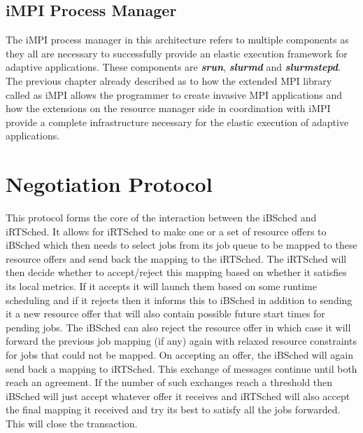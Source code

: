 \subsection{iMPI Process Manager}
The iMPI process manager in this architecture refers to multiple components as they all are necessary to successfully provide an elastic execution framework for adaptive applications. These components are \textbf{\textit{srun}}, \textbf{\textit{slurmd}} and \textbf{\textit{slurmstepd}}. The previous chapter already described as to how the extended MPI library called as iMPI allows the programmer to create invasive MPI applications and how the extensions on the resource manager side in coordination with iMPI provide a complete infrastructure necessary for the elastic execution of adaptive applications.
\section{Negotiation Protocol}
This protocol forms the core of the interaction between the iBSched and iRTSched. It allows for iRTSched to make one or a set of resource offers to iBSched which then needs to select jobs from its job queue to be mapped to these resource offers and send back the mapping to the iRTSched. The iRTSched will then decide whether to accept/reject this mapping based on whether it satisfies its local metrics. If it accepts it will launch them based on some runtime scheduling and if it rejects then it informs this to iBSched in addition to sending it a new resource offer
that will also contain possible future start times for pending jobs. The iBSched can also reject the resource offer in which case it will forward the previous job mapping (if any) again with relaxed resource constraints for jobs that could not be mapped. On accepting an offer, the iBSched will again send back a mapping to iRTSched. This exchange of messages continue until both reach an agreement. If the number of such exchanges reach a threshold then iBSched will just accept whatever offer it receives and iRTSched will also accept the final mapping it received and try its best to satisfy all the jobs forwarded. This will close the transaction.
